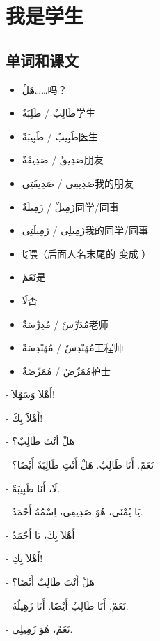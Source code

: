 \chapter{我是学生}


\section{单词和课文}

\begin{itemize}
    \item \ac{هَلْ}{……吗？}
    \item \ac{طَالِبٌ / طَلِبَةٌ}{学生}
    \item \ac{طَبِيبٌ / طَبِيبَةٌ}{医生}
    \item \ac{صَدِيقٌ / صَدِيقَةٌ}{朋友}
    \item \ac{صَدِيقِى / صَدِيقَتِى}{我的朋友}
    \item \ac{زَمِيلٌ / زَمِيلَةٌ}{同学/同事}
    \item \ac{زَمِيلِى / زَمِيلَتِى}{我的同学/同事}
    \item \ac{يَا}{喂（后面人名末尾的  变成 ）}
    \item \ac{نَعَمْ}{是}
    \item \ac{لَا}{否}
    \item \ac{مُدَرِّسٌ / مُدِرِّسَةٌ}{老师}
    \item \ac{مُهَنْدِسٌ / مُهَنْدِسَةٌ}{工程师}
    \item \ac{مُمَرِّضٌ / مُمَرِّضَةٌ}{护士}
\end{itemize}

\begin{Arabic}
    - أَهْلاََ وَسَهْلاََ!

    - أَهْلاََ بِكَ!

    - هَلْ أنْتَ طَالِبٌ؟

    - نَعَمْ. أَنَا طَالِبٌ. هَلْ أَنْتِ طَالِبَةٌ أَيْضََا؟

    - لَا، أَنَا طَبِيبَةٌ.

    - يَا يُمْنَى، هُوَ صَدِيقِى، اِسْمُهُ أَحّمَدُ.

    - أَهْلاََ بِكَ، يَا أَحّمَدُ

    - أَهْلاََ بِكِ!

    - هَلْ أَنْتَ طَالِبٌ أَيْضََا؟

    - نَعَمْ. أَنَا طَالِبٌ أَيْضََا. أَنَا زَهِيلُهُ.

    - نَعَمْ، هُوَ زَمِيلِى.
\end{Arabic}

